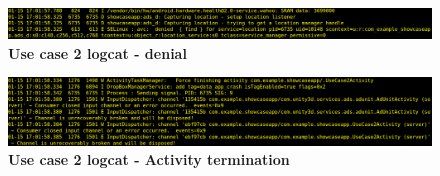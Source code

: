 \begin{figure}[h]
  \centering
  \includegraphics[width=\textwidth]{chapters/seapp/figs/ae/uc25.png}
  \caption{\label{fig:seapp_uc2_logcat1}\bf Use case 2 logcat - \sel denial}  
\end{figure}      
\vspace{-1.3em}
\begin{figure}[h]
  \centering
  \includegraphics[width=\textwidth]{chapters/seapp/figs/ae/uc26.png}
  \caption{\label{fig:seapp_uc2_logcat2}\bf Use case 2 logcat - Activity termination}  
\end{figure}      


